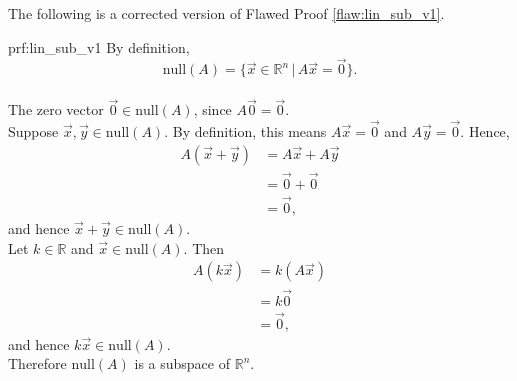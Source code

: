 The following is a corrected version of Flawed Proof \ref{flaw:lin_sub_v1}.
\begin{prf}{prf:lin_sub_v1}
By definition, \[\mathrm{null}(A)=\{\vec{x}\in\mathbb{R}^n\,|\, A\vec{x}=\vec{0}\}.\] \\

\noindent The zero vector $\vec{0}\in\mathrm{null}(A)$, since $A\vec{0}=\vec{0}$. \\

\noindent Suppose $\vec{x},\vec{y}\in\mathrm{null}(A)$. By definition, this means $A\vec{x}=\vec{0}$ and $A\vec{y}=\vec{0}$. Hence,
\begin{align*}
A(\vec{x}+\vec{y}) &= A\vec{x}+A\vec{y} \\
&= \vec{0} + \vec{0} \\
&= \vec{0},
\end{align*}
and hence $\vec{x}+\vec{y}\in\mathrm{null}(A)$. \\

\noindent Let $k\in\mathbb{R}$ and $\vec{x}\in\mathrm{null}(A)$. Then
\begin{align*}
A(k\vec{x}) &= k(A\vec{x}) \\ &= k\vec{0} \\ &= \vec{0},
\end{align*}
and hence $k\vec{x}\in\mathrm{null}(A)$. \\

\noindent Therefore $\mathrm{null}(A)$ is a subspace of $\mathbb{R}^n$.
\end{prf} 